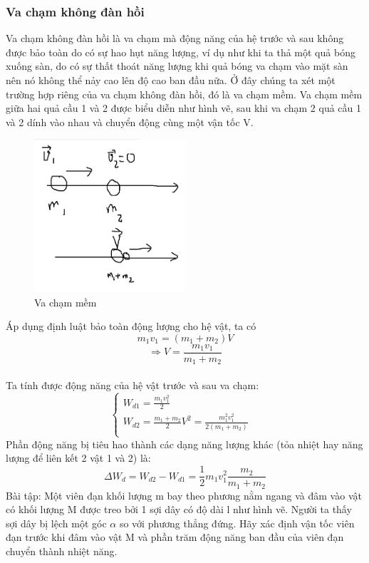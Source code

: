 \subsubsection{Va chạm không đàn hồi}
Va chạm không đàn hồi là va chạm mà động năng của hệ trước và sau không được bảo toàn do có sự hao hụt năng lượng, ví dụ như khi ta thả một quả bóng xuống sàn, do có sự thất thoát năng lượng khi quả bóng va chạm vào mặt sàn nên nó không thể nảy cao lên độ cao ban đầu nữa. Ở đây chúng ta xét một trường hợp riêng của va chạm không đàn hồi, đó là va chạm mềm.
Va chạm mềm giữa hai quả cầu 1 và 2 được biểu diễn như hình vẽ, sau khi va chạm 2 quả cầu 1 và 2 dính vào nhau và chuyển động cùng một vận tốc V.
\begin{figure}
    \centering
    \includegraphics[width=0.5\textwidth]{mem.png}
    \caption{Va chạm mềm}
    \label{mem}
\end{figure}
Áp dụng định luật bảo toàn động lượng cho hệ vật, ta có $$m_{1}v_{1}=(m_{1}+m_{2})V$$
$$\Rightarrow V=\frac{m_{1}v_{1}}{m_{1}+m_{2}}$$
\\Ta tính được động năng của hệ vật trước và sau va chạm:
$$\left\{\begin{array}{ll}
    W_{d1}=\frac{m_{1}v_{1}^2}{2} &\\
    W_{d2}=\frac{m_{1}+m_{2}}{2}V^2=\frac{m_{1}^2v_{1}^2}{2(m_{1}+m_{2})} &\\
    \end{array}\right.$$
Phần động năng bị tiêu hao thành các dạng năng lượng khác (tỏa nhiệt hay năng lượng để liên kết 2 vật 1 và 2) là:
$$\Delta W_{d}=W_{d2}-W_{d1}=\frac{1}{2}m_{1}v_{1}^2\frac{m_{2}}{m_{1}+m_{2}}$$
Bài tập: Một viên đạn khối lượng m bay theo phương nằm ngang và đâm vào vật có khối lượng M được treo bởi 1 sợi dây có độ dài l như hình vẽ. Người ta thấy sợi dây bị lệch một góc $\alpha$ so với phương thẳng đứng. Hãy xác định vận tốc viên đạn trước khi đâm vào vật M và phần trăm động năng ban đầu của viên đạn chuyển thành nhiệt năng.
